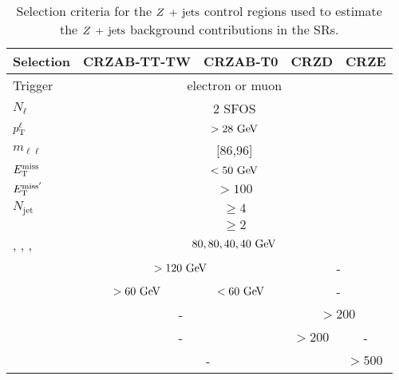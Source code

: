 	\begin{table}[htpb]
	\def\arraystretch{1.5}
	  \caption{Selection criteria for the $Z\,+\,\mathrm{jets}$ control regions used to estimate the $Z\,+\,\mathrm{jets}$ background contributions in the \acp{SR}.}
	  \begin{center}
	    \begin{tabular}{lcccc}
	      \toprule
	      \textbf{Selection}  & \textbf{CRZAB-TT-TW} & \textbf{CRZAB-T0} & \textbf{CRZD} & \textbf{CRZE}       \\
	      \toprule
		     Trigger              & \multicolumn{4}{c}{electron or muon}                                   \\ 
		     $N_{\ell}$           & \multicolumn{4}{c}{$2$ \ac{SFOS}}           \\ 
		     $p_{\mathrm{T}}^{\ell}$         & \multicolumn{4}{c}{$>28 \gev$}                                        \\ 
		     $m_{\ell\ell}$       & \multicolumn{4}{c}{[86,96] \gev}                                      \\ 
		     \midrule
		      $E_{\mathrm{T}}^{\mathrm{miss}}$              & \multicolumn{4}{c}{$<50 \gev$}                                        \\ 
		      $E_{\mathrm{T}}^{\mathrm{miss'}}$         & \multicolumn{4}{c}{$ > 100$ \gev}                                     \\
		      \midrule
		     $N_{\mathrm{jet}}$   & \multicolumn{4}{c}{$\ge 4$}                                           \\
		     \nBJet     & \multicolumn{4}{c}{$\ge 2 $}                                          \\
		      \ptzero, \ptone, \pttwo, \ptthree            & \multicolumn{4}{c}{$80,80,40,40\gev$}                              \\
		      \midrule
		       \mantikttwelvezero & \multicolumn{2}{c}{$>120\gev$} & \multicolumn{2}{c}{-}                \\ 
		       \mantikttwelveone  & $>60\gev$                      & $<60\gev$    & \multicolumn{2}{c}{-} \\ 
		       \midrule
		       \mtbminprime       & \multicolumn{2}{c}{-}          & \multicolumn{2}{c}{$>200\,$\gev}     \\
		      \mtbmaxprime        & \multicolumn{2}{c}{-}          & $>200\,$\gev & -                     \\
		      \HT                 & \multicolumn{3}{c}{-}          & $>500\,$\gev                         \\			     	\bottomrule
	    \end{tabular}
	  \end{center}
	  \label{tab:selectionCRZs}
	\end{table}		

